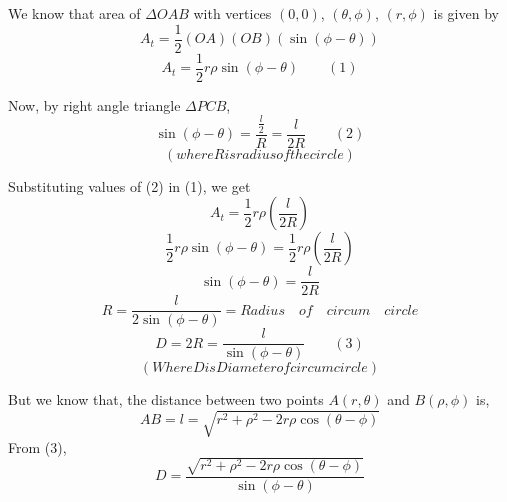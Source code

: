 \documentclass[journal,12pt,twocolumn]{IEEEtran}
\begin{document}
We know that area of $\Delta OAB $ with vertices $(0,0)$, $(\theta, \phi)$, $(r,\phi)$ is given by
$$ A_t = \frac{1}{2}(OA)(OB)(\sin(\phi-\theta)) $$
$$ A_t = \frac{1}{2}r\rho\sin(\phi-\theta) \qquad (1)$$ 

Now, by right angle triangle $\Delta PCB $,
$$ \sin(\phi-\theta) = \frac{\frac{l}{2}}{R} = \frac{l}{2R} \qquad (2) $$
$$(where R is radius of the circle)$$

Substituting values of (2) in (1), we get
$$ A_t = \frac{1}{2}r\rho(\frac{l}{2R}) $$
$$ \frac{1}{2}r\rho\sin(\phi - \theta) = \frac{1}{2}r\rho(\frac{l}{2R}) $$
$$ \sin(\phi-\theta) = \frac{l}{2R} $$
$$ R = \frac{l}{2\sin(\phi-\theta)} = Radius\quad of\quad circum\quad circle $$
$$  D = 2R = \frac{l}{\sin(\phi-\theta)} \qquad(3) $$
$$ (Where D is Diameter of circum circle) $$

But we know that, the distance between two points $A(r,\theta)$ and $B(\rho,\phi)$ is,
$$ AB = l = \sqrt{r^2 + \rho^2 - 2r\rho\cos(\theta-\phi)} $$
From (3),
$$ D = \frac{\sqrt{r^2 + \rho^2 - 2r\rho\cos(\theta-\phi)}}{\sin(\phi - \theta)} $$
\end{document}
